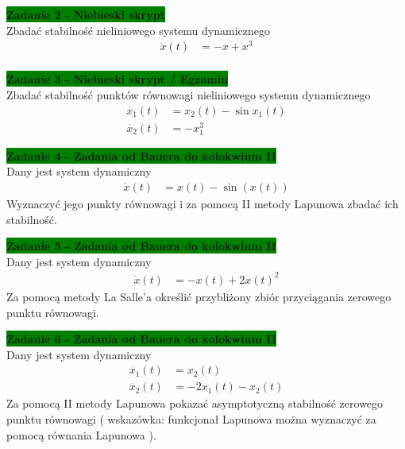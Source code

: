 \documentclass[a4paper,11pt]{article}
\begin{document}
\begin{framed}
\textbf{\colorbox{green}{Zadanie 2 - Niebieski skrypt} } \\ 
Zbadać stabilność nieliniowego systemu dynamicznego
\begin{align*}
\dot{x}(t)&=-x+x^{3} \\
\end{align*}
\end{framed}

\begin{framed}
\textbf{\colorbox{green}{Zadanie 3 - Niebieski skrypt / Egzamin } } \\ 
Zbadać stabilność punktów równowagi nieliniowego systemu dynamicznego
\begin{align*}
\dot{x_{1}}(t)&=x_{2}(t) - \sin x_{1}(t) \\
\dot{x_{2}}(t)&=-x_{1}^{3}
\end{align*}
\end{framed}

\begin{framed}
\textbf{\colorbox{green}{Zadanie 4 - Zadania od Bauera do kolokwium II} } \\ 
Dany jest system dynamiczny 
\begin{align*}
\dot{x}(t)&=x(t)- \sin (x(t))
\end{align*}
Wyznaczyć jego punkty równowagi i za pomocą II metody Lapunowa zbadać ich stabilność. 
\end{framed}

\begin{framed}
\textbf{\colorbox{green}{Zadanie 5 - Zadania od Bauera do kolokwium II }} \\ 
Dany jest system dynamiczny 
\begin{align*}
\dot{x}(t)&=-x(t)+2x(t)^{2}
\end{align*}
Za pomocą metody La Salle'a określić przybliżony zbiór przyciągania zerowego punktu równowagi. 
\end{framed}

\begin{framed}
\textbf{\colorbox{green}{Zadanie 6 - Zadania od Bauera do kolokwium II }} \\ 
Dany jest system dynamiczny 
\begin{align*}
\dot{x_{1}}(t)&=x_{2}(t) \\
\dot{x_{2}}(t)&=-2x_{1}(t)-x_{2}(t)
\end{align*}
Za pomocą II metody Lapunowa pokazać asymptotyczną stabilność zerowego punktu równowagi ( wskazówka: funkcjonał Lapunowa można wyznaczyć za pomocą równania Lapunowa ). 
\end{framed}
\end{document}
